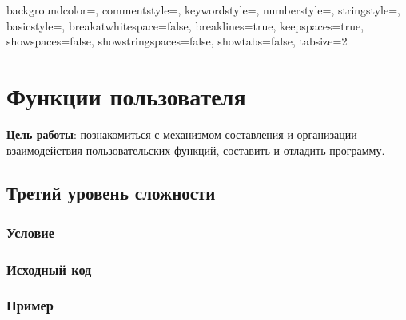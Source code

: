 
\usepackage{listings}
\usepackage{xcolor}


 {
    backgroundcolor=\color{backcolour}, commentstyle=\color{codegreen},
    keywordstyle=\color{codeblue},
    numberstyle=\tiny\color{codegray},
    stringstyle=\color{codeblue},
    basicstyle=\ttfamily\footnotesize,
    breakatwhitespace=false,         
    breaklines=true,                   
    keepspaces=true,             
    showspaces=false,                
    showstringspaces=false,
    showtabs=false,                  
    tabsize=2
}

\lstset{style=mystyle}





\section{Функции пользователя}

\textbf{Цель работы}: познакомиться с механизмом составления и организации
взаимодействия пользовательских функций, составить и отладить программу.

\subsection{Третий уровень сложности}

\subsubsection{Условие}



\subsubsection{Исходный код}


\subsubsection{Пример}




